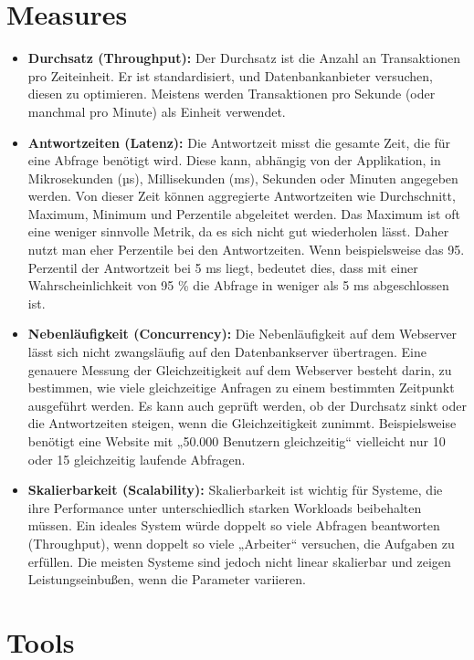 \section{Measures}
\begin{itemize}[label={--}]
    \item \textbf{Durchsatz (Throughput):} Der Durchsatz ist die Anzahl an Transaktionen pro Zeiteinheit.
    Er ist standardisiert, und Datenbankanbieter versuchen, diesen zu optimieren.
    Meistens werden Transaktionen pro Sekunde (oder manchmal pro Minute) als Einheit verwendet.
    \item \textbf{Antwortzeiten (Latenz):} Die Antwortzeit misst die gesamte Zeit, die für eine Abfrage benötigt wird.
    Diese kann, abhängig von der Applikation, in Mikrosekunden (µs), Millisekunden (ms), Sekunden oder Minuten angegeben werden.
    Von dieser Zeit können aggregierte Antwortzeiten wie Durchschnitt, Maximum, Minimum und Perzentile abgeleitet werden.
    Das Maximum ist oft eine weniger sinnvolle Metrik, da es sich nicht gut wiederholen lässt.
    Daher nutzt man eher Perzentile bei den Antwortzeiten.
    Wenn beispielsweise das 95. Perzentil der Antwortzeit bei 5 ms liegt, bedeutet dies, dass mit einer Wahrscheinlichkeit von 95 \% die Abfrage in weniger als 5 ms abgeschlossen ist.
    \item \textbf{Nebenläufigkeit (Concurrency):} Die Nebenläufigkeit auf dem Webserver lässt sich nicht zwangsläufig auf den Datenbankserver übertragen.
    Eine genauere Messung der Gleichzeitigkeit auf dem Webserver besteht darin, zu bestimmen, wie viele gleichzeitige Anfragen zu einem bestimmten Zeitpunkt ausgeführt werden.
    Es kann auch geprüft werden, ob der Durchsatz sinkt oder die Antwortzeiten steigen, wenn die Gleichzeitigkeit zunimmt.
    Beispielsweise benötigt eine Website mit „50.000 Benutzern gleichzeitig“ vielleicht nur 10 oder 15 gleichzeitig laufende Abfragen.
    \item \textbf{Skalierbarkeit (Scalability):} Skalierbarkeit ist wichtig für Systeme, die ihre Performance unter unterschiedlich starken Workloads beibehalten müssen.
    Ein ideales System würde doppelt so viele Abfragen beantworten (Throughput), wenn doppelt so viele „Arbeiter“ versuchen, die Aufgaben zu erfüllen.
    Die meisten Systeme sind jedoch nicht linear skalierbar und zeigen Leistungseinbußen, wenn die Parameter variieren.
\end{itemize}

\section{Tools}\label{sec:tools}
